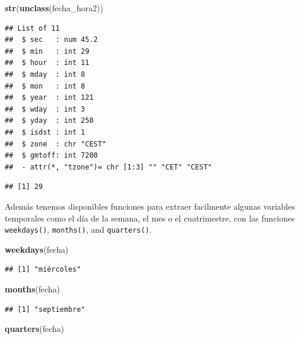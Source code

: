 \documentclass[11pt,]{book}
\newenvironment{Shaded}{\begin{snugshade}}{\end{snugshade}}
\newcommand{\CommentTok}[1]{\textcolor[rgb]{0.37,0.37,0.37}{\textit{#1}}}
\newcommand{\KeywordTok}[1]{\textcolor[rgb]{0.27,0.27,0.27}{\textbf{#1}}}
\newcommand{\NormalTok}[1]{#1}
\newcommand{\OperatorTok}[1]{\textcolor[rgb]{0.43,0.43,0.43}{\textbf{#1}}}
\begin{document}
\begin{Shaded}
\begin{Highlighting}[]
\KeywordTok{str}\NormalTok{(}\KeywordTok{unclass}\NormalTok{(fecha_hora2))}
\end{Highlighting}
\end{Shaded}

\begin{verbatim}
## List of 11
##  $ sec   : num 45.2
##  $ min   : int 29
##  $ hour  : int 11
##  $ mday  : int 8
##  $ mon   : int 8
##  $ year  : int 121
##  $ wday  : int 3
##  $ yday  : int 250
##  $ isdst : int 1
##  $ zone  : chr "CEST"
##  $ gmtoff: int 7200
##  - attr(*, "tzone")= chr [1:3] "" "CET" "CEST"
\end{verbatim}

\begin{Shaded}
\end{Shaded}

\begin{verbatim}
## [1] 29
\end{verbatim}

Además tenemos disponibles funciones para extraer facilmente algunas variables temporales como el día de la semana, el mes o el cuatrimestre, con las funciones \texttt{weekdays()}, \texttt{months()}, and \texttt{quarters()}.

\begin{Shaded}
\begin{Highlighting}[]
\KeywordTok{weekdays}\NormalTok{(fecha)}
\end{Highlighting}
\end{Shaded}

\begin{verbatim}
## [1] "miércoles"
\end{verbatim}

\begin{Shaded}
\begin{Highlighting}[]
\KeywordTok{months}\NormalTok{(fecha)}
\end{Highlighting}
\end{Shaded}

\begin{verbatim}
## [1] "septiembre"
\end{verbatim}

\begin{Shaded}
\begin{Highlighting}[]
\KeywordTok{quarters}\NormalTok{(fecha)}
\end{Highlighting}
\end{Shaded}
\end{document}
